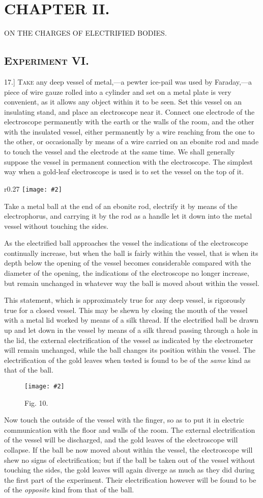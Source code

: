 \documentclass[12pt,oneside]{book}[2021/10/04]
\newcommand{\Heading}{\centering\normalfont}
\newcommand{\Chapter}[1]{\section*{\large\Heading #1}}
\newcommand{\Section}[1]{\subsection*{\normalsize\Heading\scshape #1}}
\newcommand{\Subheading}[1]{\begin{center}\small #1 \end{center}}
\newcommand{\article}[1]{\phantomsection \label{art:#1}{#1.]}}
\newcommand{\wrapfig}[3]{
\begin{wrapfigure}{r}{#1\textwidth}
\centering
\texttt{[image: \#2]}
\caption*{\small #3}
\end{wrapfigure}}
\newcommand{\widefig}[3]{
\begin{figure}[ht!]
\centering
\texttt{[image: \#2]}
\caption*{\small #3}
\end{figure}}
\newcommand{\¬}{\hphantom{0}}
\newcommand{\newchapter}{\newpage\thispagestyle{empty}}
\begin{document}
\newchapter
\Chapter{CHAPTER II.}
\Subheading{ON THE CHARGES OF ELECTRIFIED BODIES.}
\Section{Experiment VI.}

\article{17} \textsc{Take} any deep vessel of metal,---a pewter ice-pail was used
by Faraday,---a piece of wire gauze rolled into a cylinder and set
on a metal plate is very convenient, as it allows any object within
it to be seen. Set this vessel on an insulating stand, and place
an electroscope near it. Connect one electrode of the electroscope
permanently with the earth or the walls of the room, and the
other with the insulated vessel, either permanently by a wire
reaching from the one to the other, or occasionally by means of
a wire carried on an ebonite rod and made to touch the vessel
and the electrode at the same time. We shall generally suppose
the vessel in permanent connection with the electroscope.
The simplest way when a gold-leaf
electroscope is used is to set the vessel on the
top of it.

\wrapfig{0.27}{032.png}{Fig. 9.}
Take a metal ball at the end of an ebonite rod,
electrify it by means of the electrophorus, and
carrying it by the rod as a handle let it down into
the metal vessel without touching the sides.

As the electrified ball approaches the vessel the
indications of the electroscope continually increase,
but when the ball is fairly within the vessel, that
is when its depth below the opening of the vessel
becomes considerable compared with the diameter
of the opening, the indications of the electroscope no longer increase,
but remain unchanged in whatever way the ball is moved
about within the vessel.

This statement, which is approximately true for any deep vessel,
is rigorously true for a closed vessel. This may be shewn by
closing the mouth of the vessel with a metal lid worked by means
of a silk thread. If the electrified ball be drawn up and let
down in the vessel by means of a silk thread passing through a
hole in the lid, the external electrification of the vessel as indicated
by the electrometer will remain unchanged, while the ball
changes its position within the vessel. The electrification
of the gold leaves when tested is found to be
of the \textit{same} kind as that of the ball.

\widefig{0.18}{033.png}{Fig. 10.}
Now touch the outside of the vessel with the finger,
so as to put it in electric communication with the
floor and walls of the room. The external electrification
of the vessel will be discharged, and the gold
leaves of the electroscope will collapse. If the ball be
now moved about within the vessel, the electroscope
will shew no signs of electrification; but if the ball
be taken out of the vessel without touching the sides,
the gold leaves will again diverge as much as they did
during the first part of the experiment. Their electrification
however will be found to be of the \textit{opposite} kind from
that of the ball.
\end{document}
